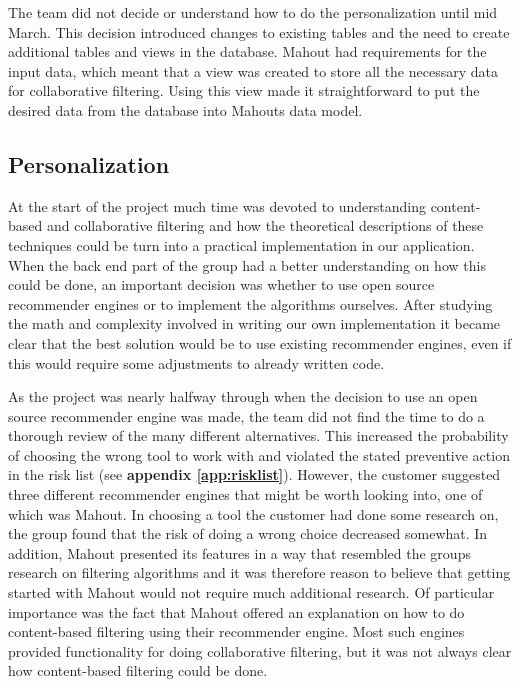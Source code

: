 The team did not decide or understand how to do the personalization until mid March. This decision introduced changes to existing tables and the need to create additional tables and views in the database. Mahout had requirements for the input data, which meant that a view was created to store all the necessary data for collaborative filtering. Using this view made it straightforward to put the desired data from the database into Mahouts data model.

\subsection{Personalization}

At the start of the project much time was devoted to understanding content-based and collaborative filtering and how the theoretical descriptions of these techniques could be turn into a practical implementation in our application. When the back end part of the group had a better understanding on how this could be done, an important decision was whether to use open source recommender engines or to implement the algorithms ourselves. After studying the math and complexity involved in writing our own implementation it became clear that the best solution would be to use existing recommender engines, even if this would require some adjustments to already written code. \newline

As the project was nearly halfway through when the decision to use an open source recommender engine was made, the team did not find the time to do a thorough review of the many different alternatives. This increased the probability of choosing the wrong tool to work with and violated the stated preventive action in the risk list (see \textbf{appendix \ref{app:risklist}}). However, the customer suggested three different recommender engines that might be worth looking into, one of which was Mahout. In choosing a tool the customer had done some research on, the group found that the risk of doing a wrong choice decreased somewhat. In addition, Mahout presented its features in a way that resembled the groups research on filtering algorithms and it was therefore reason to believe that getting started with Mahout would not require much additional research. Of particular importance was the fact that Mahout offered an explanation on how to do content-based filtering using their recommender engine. Most such engines provided functionality for doing collaborative filtering, but it was not always clear how content-based filtering could be done.\newline

